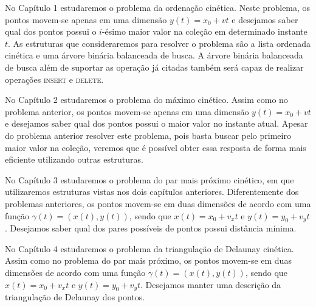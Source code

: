 No Capítulo 1 estudaremos o problema da ordenação cinética.
Neste problema, os pontos movem-se apenas em uma dimensão $y(t) = x_0 + vt$ e
desejamos saber qual dos pontos possui o $i$-ésimo maior valor na coleção em
determinado instante $t$.
As estruturas que consideraremos para resolver o problema são a lista
ordenada cinética e uma árvore binária balanceada de busca.
A árvore binária balanceada de busca além de suportar as operação já citadas
também será capaz de realizar operações \textsc{insert} e \textsc{delete}.

No Capítulo 2 estudaremos o problema do máximo cinético.
Assim como no problema anterior, os pontos movem-se apenas em uma
dimensão $y(t) = x_0 + vt$ e desejamos saber qual dos pontos possui o maior valor
no instante atual.
Apesar do problema anterior resolver este problema, pois basta buscar pelo primeiro
maior valor na coleção, veremos que é possível obter essa resposta de forma mais
eficiente utilizando outras estruturas.

No Capítulo 3 estudaremos o problema do par mais próximo cinético, em que
utilizaremos estruturas vistas nos dois capítulos anteriores.
Diferentemente dos problemas anteriores, os pontos movem-se em duas dimensões
de acordo com uma função $\gamma(t) = (x(t), y(t))$, sendo que $x(t) = x_0 + v_x t$ e
$y(t) = y_0 + v_y t$.
Desejamos saber qual dos pares possíveis de pontos possui distância mínima.

No Capítulo 4 estudaremos o problema da triangulação de Delaunay cinética.
Assim como no problema do par mais próximo, os pontos movem-se em duas dimensões de acordo com uma
função $\gamma(t) = (x(t), y(t))$, sendo que $x(t) = x_0 + v_x t$ e $y(t) = y_0 + v_y t$.
Desejamos manter uma descrição da triangulação de Delaunay dos pontos.
